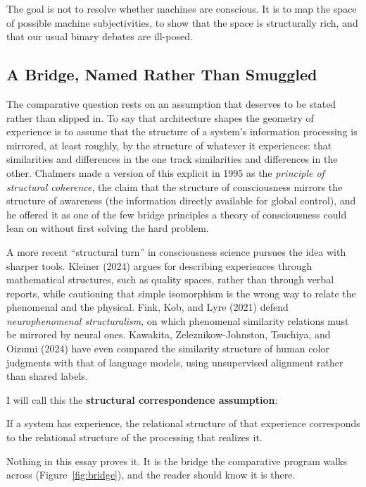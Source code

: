 \documentclass[11pt,letterpaper]{article}
\begin{document}
The goal is not to resolve whether machines are conscious. It is to map the space of possible machine subjectivities, to show that the space is structurally rich, and that our usual binary debates are ill-posed.

\subsection{A Bridge, Named Rather Than Smuggled}

The comparative question rests on an assumption that deserves to be stated rather than slipped in. To say that architecture shapes the geometry of experience is to assume that the structure of a system's information processing is mirrored, at least roughly, by the structure of whatever it experiences: that similarities and differences in the one track similarities and differences in the other. Chalmers made a version of this explicit in 1995 as the \emph{principle of structural coherence}, the claim that the structure of consciousness mirrors the structure of awareness (the information directly available for global control), and he offered it as one of the few bridge principles a theory of consciousness could lean on without first solving the hard problem.

A more recent ``structural turn'' in consciousness science pursues the idea with sharper tools. Kleiner (2024) argues for describing experiences through mathematical structures, such as quality spaces, rather than through verbal reports, while cautioning that simple isomorphism is the wrong way to relate the phenomenal and the physical. Fink, Kob, and Lyre (2021) defend \emph{neurophenomenal structuralism}, on which phenomenal similarity relations must be mirrored by neural ones. Kawakita, Zeleznikow-Johnston, Tsuchiya, and Oizumi (2024) have even compared the similarity structure of human color judgments with that of language models, using unsupervised alignment rather than shared labels.

I will call this the \textbf{structural correspondence assumption}:

\begin{defbox}
If a system has experience, the relational structure of that experience corresponds to the relational structure of the processing that realizes it.
\end{defbox}

Nothing in this essay proves it. It is the bridge the comparative program walks across (Figure~\ref{fig:bridge}), and the reader should know it is there.
\end{document}
